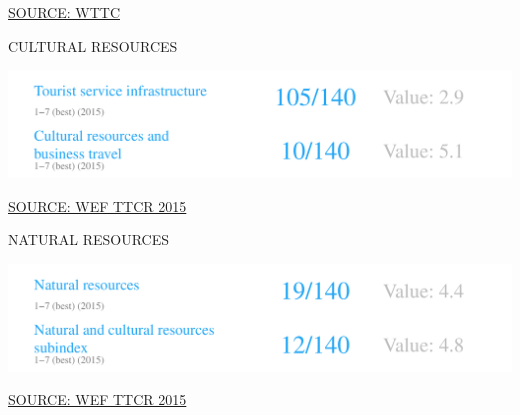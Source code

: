 \documentclass{article}\usepackage[]{graphicx}\usepackage[]{color}
\makeatletter
\def\maxwidth{ %
  \ifdim\Gin@nat@width>\linewidth
    \linewidth
  \else
    \Gin@nat@width
  \fi
}
\makeatother
\begin{document}
\begin{minipage}[t]{0.95\textwidth}
\begin{minipage}[b]{0.5\textwidth}
     \hspace{4ex}\scriptsize{\href{NA}{\textcolor[HTML]{722FF5}{SOURCE: WTTC}}}
  \end{minipage}
\end{minipage}

\begin{minipage}[c]{0.95\textwidth}
  \vspace{4ex}
  \begin{minipage}[c]{0.5\textwidth}
    \hspace{4ex}\small{\textcolor[HTML]{818181}{CULTURAL RESOURCES}}
    \vspace{1ex}


{\centering \includegraphics[width=\maxwidth]{figure/number1-1} 

}



    \hspace{4ex}\scriptsize{\href{NA}{\textcolor[HTML]{722FF5}{SOURCE: WEF TTCR 2015}}}
  \end{minipage}
  \begin{minipage}[c]{0.5\textwidth}
    \hspace{4ex}\small{\textcolor[HTML]{818181}{NATURAL RESOURCES}}
    \vspace{1ex}


{\centering \includegraphics[width=\maxwidth]{figure/number2-1} 

}



    \hspace{4ex}\scriptsize{\href{NA}{\textcolor[HTML]{722FF5}{SOURCE: WEF TTCR 2015}}}
  \end{minipage}
\end{minipage}
\end{document}
